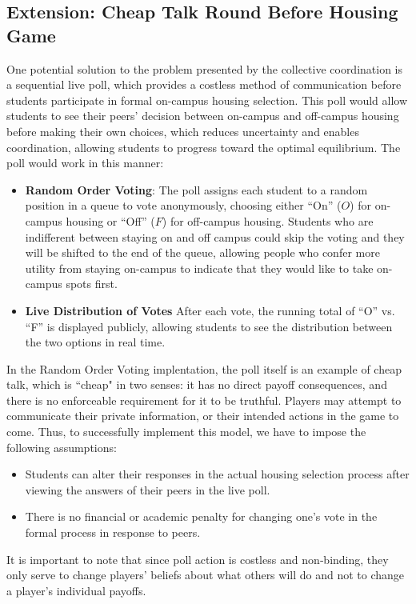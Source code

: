 \documentclass[12pt]{article}
\begin{document}
\subsection{Extension: Cheap Talk Round Before Housing Game}
One potential solution to the problem presented by the collective coordination is a sequential live poll, which provides a costless method of communication before students participate in formal on-campus housing selection. This poll would allow students to see their peers’ decision between on-campus and off-campus housing before making their own choices, which reduces uncertainty and enables coordination, allowing students to progress toward the optimal equilibrium. The poll would work in this manner:
\begin{itemize}
    \item \textbf{Random Order Voting}: The poll assigns each student to a random position in a queue to vote anonymously, choosing either “On” ($O$) for on-campus housing or “Off” ($F$) for off-campus housing.  Students who are indifferent between staying on and off campus could skip the voting and they will be shifted to the end of the queue, allowing people who confer more utility from staying on-campus to indicate that they would like to take on-campus spots first.
    \item \textbf{Live Distribution of Votes} After each vote, the running total of “O” vs. “F” is displayed publicly, allowing students to see the distribution between the two options in real time.
\end{itemize}
In the Random Order Voting implentation, the poll itself is an example of cheap talk, which is “cheap" in two senses: it has no direct payoff consequences, and there is no enforceable requirement for it to be truthful. Players may attempt to communicate their private information, or their intended actions in the game to come. Thus, to successfully implement this model, we have to impose the following assumptions:
\begin{itemize}
    \item Students can alter their responses in the actual housing selection process after viewing the answers of their peers in the live poll.
    \item There is no financial or academic penalty for changing one’s vote in the formal process in response to peers.
\end{itemize}
It is important to note that since poll action is costless and non‐binding, they only serve to change players’ beliefs about what others will do and not to change a player’s individual payoffs.
\end{document}
